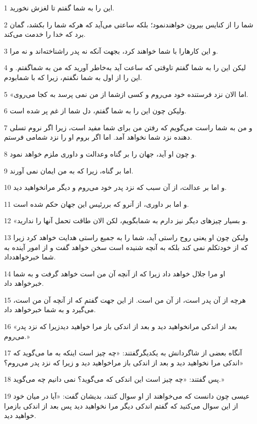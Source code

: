 \par 1 این را به شما گفتم تا لغزش نخورید.
\par 2 شما را از کنایس بیرون خواهندنمود؛ بلکه ساعتی می‌آید که هر‌که شما را بکشد، گمان برد که خدا را خدمت می‌کند.
\par 3 و این کارهارا با شما خواهند کرد، بجهت آنکه نه پدر راشناخته‌اند و نه مرا.
\par 4 لیکن این را به شما گفتم تاوقتی که ساعت آید به‌خاطر آورید که من به شماگفتم. و این را از اول به شما نگفتم، زیرا که با شمابودم.
\par 5 «اما الان نزد فرستنده خود می‌روم و کسی ازشما از من نمی پرسد به کجا می‌روی.
\par 6 ولیکن چون این را به شما گفتم، دل شما از غم پر شده است.
\par 7 و من به شما راست می‌گویم که رفتن من برای شما مفید است، زیرا اگر نروم تسلی دهنده نزد شما نخواهد آمد. اما اگر بروم او را نزد شمامی فرستم.
\par 8 و چون او آید، جهان را بر گناه وعدالت و داوری ملزم خواهد نمود.
\par 9 اما بر گناه، زیرا که به من ایمان نمی آورند.
\par 10 و اما بر عدالت، از آن سبب که نزد پدر خود می‌روم و دیگر مرانخواهید دید.
\par 11 و اما بر داوری، از آنرو که بررئیس این جهان حکم شده است.
\par 12 «و بسیار چیزهای دیگر نیز دارم به شمابگویم، لکن الان طاقت تحمل آنها را ندارید.
\par 13 ولیکن چون او یعنی روح راستی آید، شما را به جمیع راستی هدایت خواهد کرد زیرا که از خودتکلم نمی کند بلکه به آنچه شنیده است سخن خواهد گفت و از امور آینده به شما خبر‌خواهدداد.
\par 14 او مرا جلال خواهد داد زیرا که از آنچه آن من است خواهد گرفت و به شما خبر‌خواهد داد.
\par 15 هر‌چه از آن پدر است، از آن من است. از این جهت گفتم که از آنچه آن من است، می‌گیرد و به شما خبر‌خواهد داد.
\par 16 «بعد از اندکی مرانخواهید دید و بعد از اندکی باز مرا خواهید دیدزیرا که نزد پدر می‌روم.»
\par 17 آنگاه بعضی از شاگردانش به یکدیگرگفتند: «چه چیز است اینکه به ما می‌گوید که اندکی مرا نخواهید دید و بعد از اندکی باز مراخواهید دید و زیرا که نزد پدر می‌روم؟»
\par 18 پس گفتند: «چه چیز است این اندکی که می‌گوید؟ نمی دانیم چه می‌گوید.»
\par 19 عیسی چون دانست که می‌خواهند از او سوال کنند، بدیشان گفت: «آیا در میان خود از این سوال می‌کنید که گفتم اندکی دیگر مرا نخواهید دید پس بعد از اندکی بازمرا خواهید دید.

